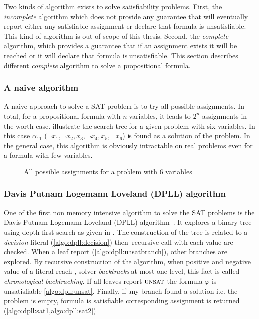 Two kinds of algorithm exists to solve satisfiability problems.
First, the \emph{incomplete} algorithm which does not provide any guarantee that will eventually report either any satisfiable assignment or declare that formula is unsatisfiable. This kind of algorithm is out of scope of this thesis. 
Second, the \emph{complete} algorithm, which provides a guarantee that if an assignment exists
it will be reached or it will declare that formula is unsatisfiable.
This section describes different \emph{complete }algorithm to solve a propositional formula.



\subsubsection{A naive algorithm}
A naive approach to solve a SAT problem is to try all possible assignments. In total,
for a propositional formula with $n$ variables, it leads to $2^n$ assignments in the worth case.  
 illustrate the search tree for a given problem with six variables.
In this case $\alpha_{11}$ ($\neg x_1, \neg x_2, x_3, \neg x_4, x_5, \neg x_6 $) is found as a solution of the problem. In the general case,
this algorithm is obviously intractable on real problems even for a formula with few variables.


\begin{figure}[!htbp]
	\centering
	
	\caption{All possible assignments for a problem with 6 variables}
	\label{fig:naive_algo}
\end{figure}


\subsubsection{Davis Putnam Logemann Loveland (DPLL) algorithm}\label{sec:dpll}

One of the first non memory intensive algorithm to solve the SAT problems is 
the Davis Putnam Logemann Loveland (DPLL) algorithm~\cite{dpll_62}. 
It explores a binary tree using depth first search as given in .
The construction of the tree is related to a \emph{decision} literal (\cref{algo:dpll:decision}) then,
recursive call with each value are checked.
When a leaf report \unsat (\cref{algo:dpll:unsatbranch}), other branches are explored.
By recursive construction of the algorithm, when positive and negative value of a literal reach \unsat,
solver \emph{backtracks} at most one level, this fact is called \emph{chronological backtracking}.
If all leaves report $\textsc{unsat}$  the formula $\varphi$ is unsatisfiable \cref{algo:dpll:unsat}.
Finally, if any branch found a solution  i.e. the problem is empty,
formula is satisfiable corresponding assignment is returned (\cref{algo:dpll:sat1,algo:dpll:sat2})

